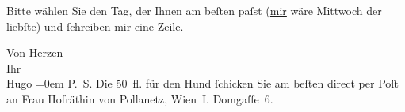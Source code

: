 \pstart
           Bitte wählen Sie den Tag, der Ihnen am beſten paſst (\uline{mir} wäre Mittwoch der liebſte) und{ }ſchreiben mir  eine Zeile.\pend
           
\pstart
           Von Herzen{\\[\baselineskip]}Ihr{\\[\baselineskip]}\spacefill\mbox{Hugo}\pend
           \leftskip=0em{}
\pstart
           \noindent{}P. S. Die 50 fl. für den Hund{ }ſchicken Sie {\pb}am beſten direct per Poſt an
                  Frau Hofräthin von Pollanetz, Wien I. Domgaſſe 6.\pend
           \endnumbering{}  \newcommand{\dateiname}{L01209}\newcommand{\titel}{Hugo von Hofmannsthal an Arthur Schnitzler, 26. 3. [1902]}\newcommand{\editorInnen}{Martin Anton Müller und Gerd-Hermann Susen}
